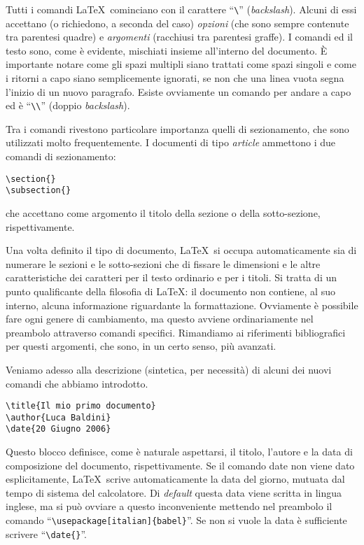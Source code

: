 Tutti i comandi \LaTeX\ cominciano con il carattere ``\verb|\|''
(\emph{backslash}). Alcuni di essi accettano (o richiedono, a seconda del
caso) \emph{opzioni} (che sono sempre contenute tra parentesi quadre) e
\emph{argomenti} (racchiusi tra parentesi graffe).
I comandi ed il testo sono, come \`e evidente, mischiati insieme all'interno
del documento. \`E importante notare come gli spazi multipli siano trattati
come  spazi singoli e come i ritorni a capo siano semplicemente ignorati,
se non che una linea vuota segna l'inizio di un nuovo paragrafo.
Esiste ovviamente un comando per andare a capo ed \`e ``\verb|\\|''
(doppio \emph{backslash}).

Tra i comandi rivestono particolare importanza quelli di sezionamento, che sono
utilizzati molto frequentemente. I documenti di tipo \emph{article} ammettono
i due comandi di sezionamento:
\begin{verbatim}
\section{}
\subsection{}
\end{verbatim}
che accettano come argomento il titolo della sezione o della sotto-sezione,
rispettivamente.

Una volta definito il tipo di documento, \LaTeX\ si occupa automaticamente sia
di numerare le sezioni e le sotto-sezioni che di fissare le dimensioni e
le altre caratteristiche dei caratteri per il testo ordinario e per i titoli.
Si tratta di un punto qualificante della filosofia di \LaTeX: il documento non
contiene, al suo interno, alcuna informazione riguardante la formattazione.
Ovviamente \`e possibile fare ogni genere di cambiamento, ma questo avviene
ordinariamente nel preambolo attraverso comandi specifici. Rimandiamo ai
riferimenti bibliografici per questi argomenti, che sono, in un certo senso,
pi\`u avanzati.

Veniamo adesso alla descrizione (sintetica, per necessit\`a) di alcuni dei
nuovi comandi che abbiamo introdotto.

\begin{verbatim}
\title{Il mio primo documento}
\author{Luca Baldini}
\date{20 Giugno 2006}
\end{verbatim}
Questo blocco definisce, come \`e naturale aspettarsi, il titolo, l'autore e
la data di composizione del documento, rispettivamente.
Se il comando date non viene dato esplicitamente, \LaTeX\ scrive
automaticamente la data del giorno, mutuata dal tempo di sistema del
calcolatore. Di \emph{default} questa data viene scritta in lingua inglese,
ma si pu\`o ovviare a questo inconveniente mettendo nel preambolo il comando
``\verb|\usepackage[italian]{babel}|''. Se non si vuole la data \`e
sufficiente scrivere ``\verb|\date{}|''.

